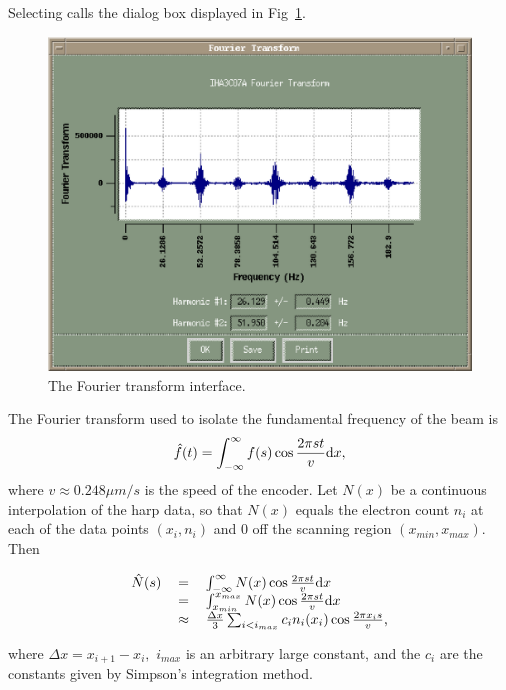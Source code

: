 Selecting  calls the dialog box displayed in Fig~\ref{fig:transform}.
\begin{figure}[htp]
\includegraphics{beamline/fourier_transform.ps}
\caption{The Fourier transform interface.}\label{fig:transform}
\end{figure}
The Fourier transform used to isolate the fundamental frequency of the beam is
\begin{equation}
\hat f(t)=\int_{-\infty}^\infty f(s)\cos \frac{2 \pi s t}{v} {\rm d}x,
\end{equation}
where $v\approx 0.248\mu m/s$ is the speed of the encoder.  Let $N(x)$ be a continuous interpolation of
the harp data, so that $N(x)$ equals the electron count $n_i$ at each of the data points $(x_i, n_i)$ and
0 off the scanning region $(x_{min}, x_{max})$. Then
\begin{center}
\begin{equation}
\begin{tabular}{rcl}
$\hat N(s)$&$=$&$\int_{-\infty}^\infty N(x)\cos \frac{2 \pi s t}{v} {\rm d}x$ \\
	   &$=$&$\int_{x_{min}}^{x_{max}} N(x)\cos \frac{2 \pi s t}{v} {\rm d}x $\\
	   &$\approx$&$ \frac{\Delta x}{3}\sum_{i<i_{max}} c_i n_i(x_i) \cos \frac{2 \pi x_i s}{v}$,
\end{tabular}
\end{equation}
\end{center}
where $\Delta x=x_{i+1}-x_i,$ $i_{max}$ is an arbitrary large constant, and the $c_i$ are the constants given
by Simpson's integration method.

